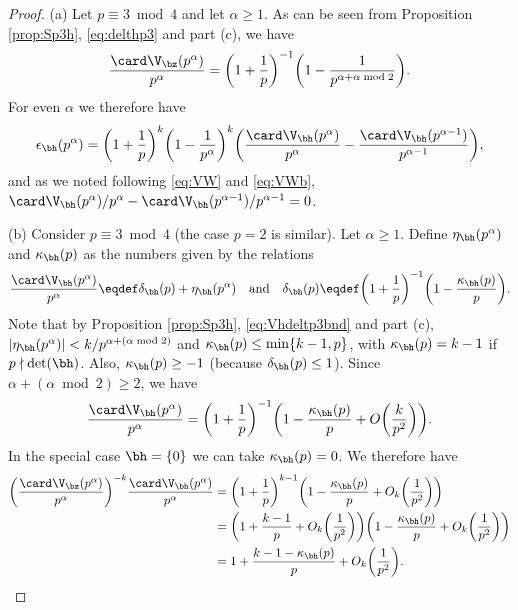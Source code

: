 \documentclass[12pt, reqno, twoside, letterpaper]{amsart}
\begin{document}
\begin{proof}
%
(a)
%
Let $p \equiv 3 \bmod 4$ and let $\alpha \ge 1$.
%
As can be seen from Proposition \ref{prop:Sp3h}, 
\eqref{eq:delthp3} and part (c), we have 
\begin{equation}
 \label{eq:iotalempf1}
 \frac{\card \V_{\bz}(p^{\alpha})}{p^{\alpha}}
  =
   \bigg(1 + \frac{1}{p}\bigg)^{-1}
    \bigg(1 - \frac{1}{p^{\alpha + \alpha \bmod 2}}\bigg).
\end{equation}
%
For even $\alpha$ we therefore have  
\[
 \epsilon_{\bh}(p^{\alpha})
  =
   \bigg(1 + \frac{1}{p}\bigg)^k
    \bigg(1 - \frac{1}{p^{\alpha}}\bigg)^k
     \bigg(
      \frac{\card \V_{\bh}(p^{\alpha})}{p^{\alpha}}
     -
        \frac{\card \V_{\bh}(p^{\alpha - 1})}{p^{\alpha - 1}}
     \bigg),
\]
and as we noted following \eqref{eq:VW} and \eqref{eq:VWb}, 
$
 \card \V_{\bh}(p^{\alpha})/p^{\alpha} 
  - 
   \card \V_{\bh}(p^{\alpha - 1})/p^{\alpha - 1}
    = 
     0
$. 

(b)
%
Consider $p \equiv 3 \bmod 4$ (the case $p = 2$ is similar).
%
Let $\alpha \ge 1$.
%
Define $\eta_{\bh}(p^{\alpha})$ and $\kappa_{\bh}(p)$ as the 
numbers given by the relations
\begin{equation}
 \label{eq:defetakappa}
 \frac{\card \V_{\bh}(p^{\alpha})}{p^{\alpha}}
  \eqdef 
   \delta_{\bh}(p) + \eta_{\bh}(p^{\alpha}) 
    \quad 
     \text{and}
      \quad 
 \delta_{\bh}(p) 
  \eqdef
   \bigg(1 + \frac{1}{p}\bigg)^{-1}
    \bigg(1 - \frac{\kappa_{\bh}(p)}{p}\bigg).
\end{equation}
%
Note that by Proposition \ref{prop:Sp3h}, \eqref{eq:Vhdeltp3bnd} 
and part (c),  
$
 |\eta_{\bh}(p^{\alpha})| 
  < 
   k/p^{\alpha + (\alpha \bmod 2)}
$ and 
$\kappa_{\bh}(p) \le \min\{k - 1,p\}$, with 
$\kappa_{\bh}(p) = k - 1$ if $p \nmid \det(\bh)$.
%
Also, $\kappa_{\bh}(p) \ge -1$ (because $\delta_{\bh}(p) \le 1$).
%
Since $\alpha + (\alpha \bmod 2) \ge 2$, we have 
\[
 \frac{\card \V_{\bh}(p^{\alpha})}{p^{\alpha}}
  =
   \bigg(1 + \frac{1}{p}\bigg)^{-1}
    \bigg(1 - \frac{\kappa_{\bh}(p)}{p} + O\bigg(\frac{k}{p^2}\bigg)\bigg).
\]
%
In the special case $\bh = \{0\}$ we can take 
$\kappa_{\bh}(p) = 0$.
%
We therefore have  
\begin{align*}
 \bigg(\frac{\card \V_{\bz}(p^{\alpha})}{p^{\alpha}}\bigg)^{-k}
  \frac{\card \V_{\bh}(p^{\alpha})}{p^{\alpha}}
  &
   =
    \bigg(1 + \frac{1}{p}\bigg)^{k - 1}
       \bigg(1 - \frac{\kappa_{\bh}(p)}{p} + O_k\bigg(\frac{1}{p^2}\bigg)\bigg)
   \\
  &
   =
     \bigg(1 + \frac{k - 1}{p} +O_k\bigg(\frac{1}{p^2}\bigg)\bigg)
      \bigg(1 - \frac{\kappa_{\bh}(p)}{p} + O_k\bigg(\frac{1}{p^2}\bigg)\bigg)
 \\
   & 
    = 
      1 + \frac{k - 1 - \kappa_{\bh}(p)}{p} + O_k\bigg(\frac{1}{p^2}\bigg).
\end{align*}


\end{proof}
\end{document}
